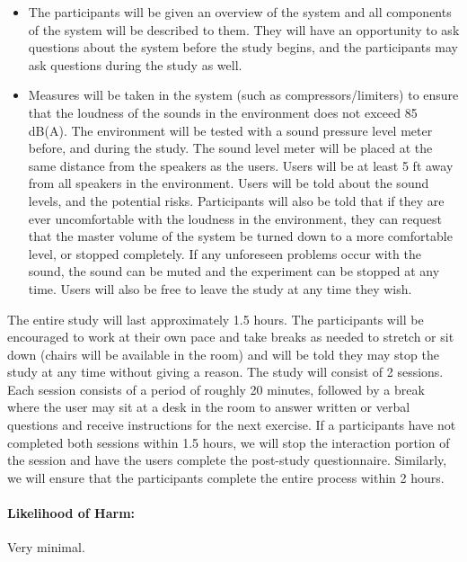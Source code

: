 \documentclass[10pt]{article}
\begin{document}
\begin{itemize}

\item The participants will be given an overview of the system and all
  components of the system will be described to them.  They will have
  an opportunity to ask questions about the system before the study
  begins, and the participants may ask questions during the study as well.
  
\item Measures will be taken in the system (such as compressors/limiters)
  to ensure that the loudness of the sounds in the environment does not 
  exceed 85 dB(A). The environment will be tested with a sound pressure
  level meter before, and during the study. The sound level meter will be 
  placed at the same distance from the speakers as the users. Users will be at least 5
  ft away from all speakers in the environment. Users will be told about the 
  sound levels, and the potential risks. Participants will also be told 
  that if they are ever uncomfortable with the loudness in the environment,
  they can request that the master volume of the system be turned down to a
  more comfortable level, or stopped completely. If any unforeseen problems occur
  with the sound, the sound can be muted and the experiment can be stopped at 
  any time. Users will also be free to leave the study at any time they wish.

\end{itemize}

\noindent 
The entire study will last approximately 1.5 hours.  The participants
will be encouraged to work at their own pace and take breaks as needed
to stretch or sit down (chairs will be available in the room) and will
be told they may stop the study at any time without giving a reason.
The study will consist of 2 sessions. Each session consists
of a period of roughly 20 minutes,
followed by a break where the user may sit at a desk in the
room to answer written or verbal questions and receive instructions
for the next exercise.  If a participants have not completed both sessions
within 1.5 hours, we will stop the interaction portion of the session
and have the users complete the post-study questionnaire. Similarly, we
will ensure that the participants complete the entire process within
2 hours.

\paragraph{Likelihood of Harm:}   Very minimal.
\end{document}
